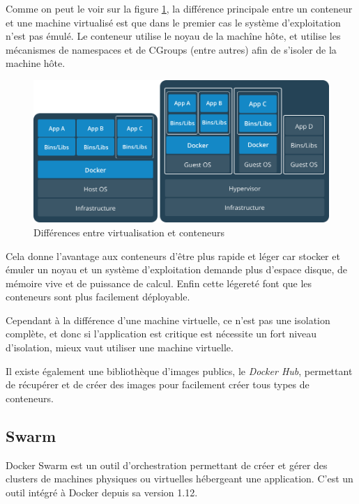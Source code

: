 Comme on peut le voir sur la figure \ref{fig:diffvm}, la différence principale entre un conteneur 
et une machine virtualisé est que dans le premier cas le système d'exploitation n'est pas émulé.
Le conteneur utilise le noyau de la machîne hôte, et utilise les mécanismes de namespaces et de 
CGroups (entre autres) afin de s'isoler de la machine hôte.

\begin{figure}
    \centering
    \includegraphics[width=\textwidth]{img/vm-container}
    \caption{Différences entre virtualisation et conteneurs}
    \label{fig:diffvm}
\end{figure}

Cela donne l'avantage aux conteneurs d'être plus rapide et léger car stocker et émuler un noyau
et un système d'exploitation demande plus d'espace disque, de mémoire vive et de puissance de
calcul. Enfin cette légereté font que les conteneurs sont plus facilement déployable.

Cependant à la différence d'une machine virtuelle, ce n'est pas une isolation complète, et donc
si l'application est critique est nécessite un fort niveau d'isolation, mieux vaut utiliser une
machine virtuelle.\newline

Il existe également une bibliothèque d’images publics, le \emph{Docker Hub}, permettant de
récupérer et de créer des images pour facilement créer tous types de conteneurs.

\subsection{Swarm}

Docker Swarm est un outil d’orchestration permettant de créer et gérer des clusters de machines
physiques ou virtuelles hébergeant une application. C’est un outil intégré à Docker depuis sa
version 1.12.

